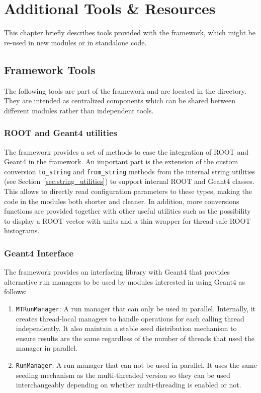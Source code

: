 \chapter{Additional Tools \& Resources}
\label{ch:additional_tools_resources}

This chapter briefly describes tools provided with the \apsq framework, which might be re-used in new modules or in standalone code.

\section{Framework Tools}

The following tools are part of the \apsq framework and are located in the  directory.
They are intended as centralized components which can be shared between different modules rather than independent tools.

\subsection{ROOT and Geant4 utilities}
\label{sec:root_and_geant4_utilities}
The framework provides a set of methods to ease the integration of ROOT and Geant4 in the framework.
An important part is the extension of the custom conversion \texttt{to\_string} and \texttt{from\_string} methods from the internal string utilities (see Section~\ref{sec:string_utilities}) to support internal ROOT and Geant4 classes.
This allows to directly read configuration parameters to these types, making the code in the modules both shorter and cleaner.
In addition, more conversions functions are provided together with other useful utilities such as the possibility to display a ROOT vector with units and a thin wrapper for thread-safe ROOT histograms.

\subsection{Geant4 Interface}
\label{sec:geant4_interface}
The framework provides an interfacing library with Geant4 that provides alternative run managers to be used by modules interested in using Geant4 as follows:
\begin{enumerate}
\item \texttt{MTRunManager}: A run manager that can only be used in parallel. Internally, it creates thread-local managers to handle operations for each calling thread independently. It also maintain a stable seed distribution mechanism to ensure results are the same regardless of the number of threads that used the manager in parallel.
\item \texttt{RunManager}: A run manager that can not be used in parallel. It uses the same seeding mechanism as the multi-threaded version so they can be used interchangeably depending on whether multi-threading is enabled or not.
\end{enumerate}

